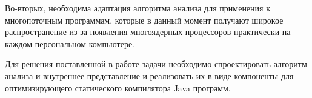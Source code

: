 \documentclass[a4,14pt,titlepage]{extarticle}
\begin{document}
    Во-вторых, необходима адаптация алгоритма анализа
    для применения к многопоточным программам,
    которые в данный момент получают широкое распространение
    из-за появления многоядерных процессоров практически
    на каждом персональном компьютере.

    Для решения поставленной в работе задачи необходимо спроектировать алгоритм
    анализа и внутреннее представление и реализовать их в виде компоненты
    для оптимизирующего статического компилятора Java программ.


  \newpage
  
\end{document}
